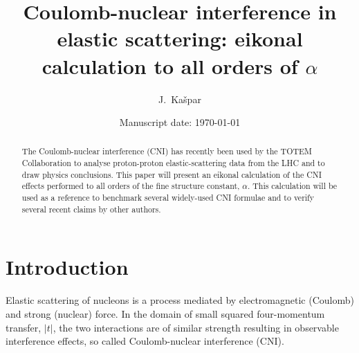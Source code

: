 \documentclass[pdftex,twocolumn,epjc3]{svjour3}
\begin{document}
\title{Coulomb-nuclear interference in elastic scattering: eikonal calculation to all orders of $\alpha$}


\author{
	J.~Ka\v spar
}



\date{Manuscript date: \today}

\maketitle

\begin{abstract}
The Coulomb-nuclear interference (CNI) has recently been used by the TOTEM Collaboration to analyse proton-proton elastic-scattering data from the LHC and to draw physics conclusions. This paper will present an eikonal calculation of the CNI effects performed to all orders of the fine structure constant, $\alpha$. This calculation will be used as a reference to benchmark several widely-used CNI formulae and to verify several recent claims by other authors.

\end{abstract}


\linenumbers


\section{Introduction}
\label{sec:introduction}

Elastic scattering of nucleons is a process mediated by electromagnetic (Coulomb) and strong (nuclear) force. In the domain of small squared four-momentum transfer, $|t|$, the two interactions are of similar strength resulting in observable interference effects, so called Coulomb-nuclear interference (CNI).
\end{document}
